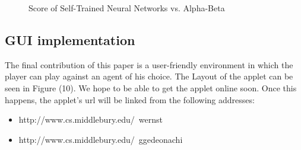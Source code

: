 \documentclass{sig-alternate-05-2015}
\begin{document}
\begin{figure}[p]
\centering
{}
\caption{Score of Self-Trained Neural Networks vs. Alpha-Beta}
\label{fig:graph5}
\end{figure}

\subsection{GUI implementation}
	The final contribution of this paper is a user-friendly environment in which the player can play against an agent of his choice. The Layout of the applet can be seen in Figure (10). We hope to be able to get the applet online soon. Once this happens, the applet's url will be linked from the following addresses:

\begin{itemize}
\itemsep0em 
\item http://www.cs.middlebury.edu/~wernst
\item http://www.cs.middlebury.edu/~ggedeonachi
\end{itemize}
\end{document}
